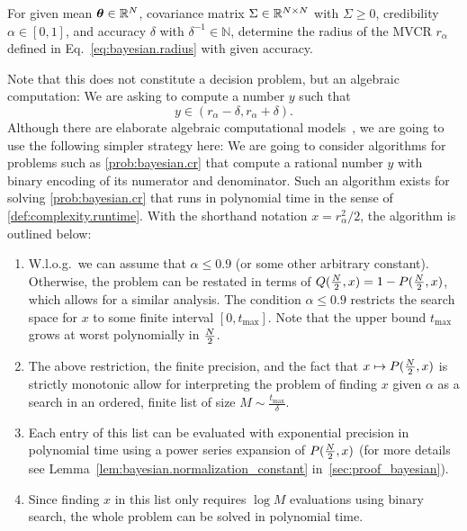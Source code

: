 \begin{problem}\label{prob:bayesian.cr}
  For given mean ${\boldsymbol{\theta}} \in \mathbb{R}^N$, covariance matrix $\Sigma \in \mathbb{R}^{N \times N}$ with $\Sigma \geq 0$, credibility $\alpha \in [0,1]$, and accuracy $\delta$ with $\delta^{-1} \in \mathbb{N}$, determine the radius of the MVCR $r_{\alpha}$ defined in Eq.~\eqref{eq:bayesian.radius} with given accuracy.
\end{problem}
Note that this does not constitute a decision problem, but an algebraic computation:
We are asking to compute a number $y$ such that
\[
  \label{eq:bayesian.precission}
  y \in (r_\alpha - \delta, r_\alpha + \delta).
\]
Although there are elaborate algebraic computational models~\cite[Sec.\ 16]{Arora_2009_Computational}, we are going to use the following simpler strategy here:
We are going to consider algorithms for problems such as \cref{prob:bayesian.cr} that compute a rational number $y$ with binary encoding of its numerator and denominator.
Such an algorithm exists for solving \cref{prob:bayesian.cr} that runs in polynomial time in the sense of \cref{def:complexity.runtime}.
With the shorthand notation $x = r^2_{\alpha}/2$, the algorithm is outlined below:
\begin{enumerate}
  \item W.l.o.g.\ we can assume that $\alpha \le 0.9$ (or some other arbitrary constant).
  Otherwise, the problem can be restated in terms of $Q(\tfrac{N}{2}, x) = 1 - P(\tfrac{N}{2}, x)$, which allows for a similar analysis.
  The condition $\alpha \le 0.9$ restricts the search space for $x$ to some finite interval $[0, t_\mathrm{max}]$.
  Note that the upper bound $t_\mathrm{max}$ grows at worst polynomially in $\tfrac{N}{2}$.
  \item The above restriction, the finite precision, and the fact that $x \mapsto P(\tfrac{N}{2}, x)$ is strictly monotonic allow for interpreting the problem of finding $x$ given $\alpha$ as a search in an ordered, finite list of size $M \sim \tfrac{t_\mathrm{max}}{\delta}$.
  \item Each entry of this list can be evaluated with exponential precision in polynomial time using a power series expansion of $P(\tfrac{N}{2}, x)$ (for more details see Lemma~\ref{lem:bayesian.normalization_constant} in~\ref{sec:proof_bayesian}).
  \item Since finding $x$ in this list only requires $\log M$ evaluations using binary search, the whole problem can be solved in polynomial time.
\end{enumerate}


